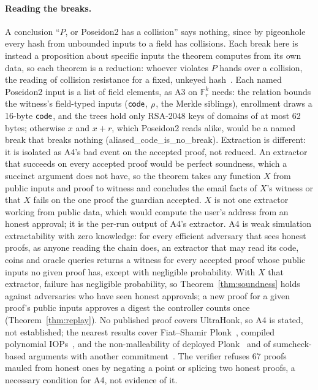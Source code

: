 \paragraph{Reading the breaks.} A conclusion ``$P$, or Poseidon2 has a
collision'' says nothing, since by pigeonhole every hash from unbounded
inputs to a field has collisions. Each break here is instead a proposition
about specific inputs the theorem computes from its own data, so each
theorem is a reduction: whoever violates $P$ hands over a collision, the
reading of collision resistance for a fixed, unkeyed
hash~\cite{rogaway-human-ignorance}. Each named Poseidon2 input is a list of
field elements, as A3 on $\mathbb{F}_r^k$ needs: the relation bounds the
witness's field-typed inputs ($\mathsf{code}$, $\rho$, the Merkle siblings),
enrollment draws a 16-byte $\mathsf{code}$, and the trees hold only RSA-2048 keys of
domains of at most 62 bytes; otherwise $x$ and $x+r$, which Poseidon2 reads
alike, would be a named break that breaks nothing
(\textsf{aliased\_code\_is\_no\_break}). Extraction is different: it is isolated
as A4's bad event on the accepted proof, not reduced. An extractor that
succeeds on every accepted proof would be perfect soundness, which a
succinct argument does not have, so the theorem takes any function $X$ from
public inputs and proof to witness and concludes the email facts of $X$'s
witness or that $X$ fails on the one proof the guardian accepted. $X$ is not
one extractor working from public data, which would compute the user's
address from an honest approval; it is the per-run output of A4's extractor.
A4 is weak simulation extractability with zero knowledge: for every efficient
adversary that sees honest proofs, as anyone reading the chain does, an
extractor that may read its code, coins and oracle queries returns a witness
for every accepted proof whose public inputs no given proof has, except with
negligible probability. With $X$ that extractor, failure has negligible
probability, so Theorem~\ref{thm:soundness} holds against adversaries who
have seen honest approvals; a new proof for a given proof's public inputs
approves a digest the controller counts once (Theorem~\ref{thm:replay}). No
published proof covers UltraHonk, so A4 is stated, not established; the
nearest results cover Fiat--Shamir Plonk~\cite{ganesh-fs-se}, compiled
polynomial IOPs~\cite{kohlweiss-piop-se}, and the non-malleability of
deployed Plonk~\cite{faonio-nonmalleable} and of sumcheck-based arguments
with another commitment~\cite{faonio-sumcheck-nonmalleable}.
The verifier refuses 67 proofs mauled from honest ones by negating a point
or splicing two honest proofs, a necessary condition for A4, not
evidence of it.

